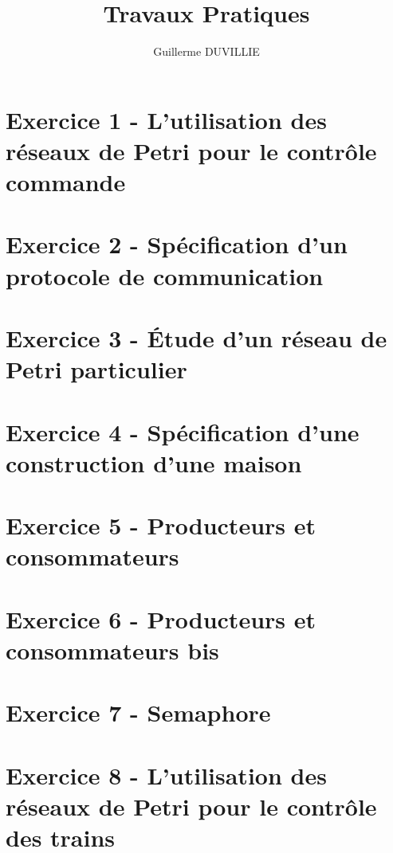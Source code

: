 \documentclass[a4paper,11pt]{article}
\author{}
\title{}
\title{Travaux Pratiques}
\author{Guillerme DUVILLIE}
\begin{document}
\maketitle

\section{Exercice 1 - L'utilisation des réseaux de Petri pour le contrôle commande}



\section{Exercice 2 - Spécification d'un protocole de communication}



\section{Exercice 3 - Étude d'un réseau de Petri particulier}



\section{Exercice 4 - Spécification d'une construction d'une maison}



\section{Exercice 5 - Producteurs et consommateurs}



\section{Exercice 6 - Producteurs et consommateurs bis}

\section{Exercice 7 - Semaphore}

\section{Exercice 8 - L'utilisation des réseaux de Petri pour le contrôle des trains}


\end{document}
